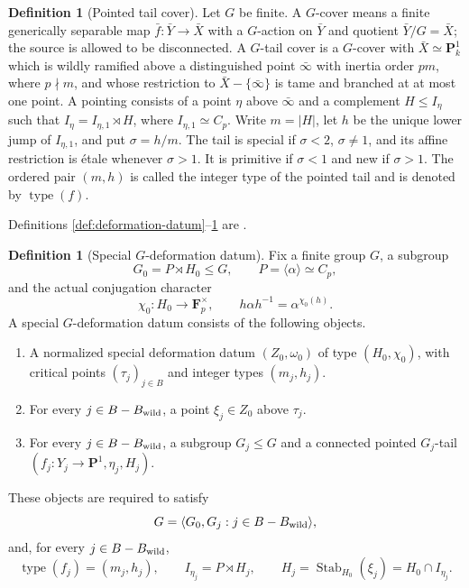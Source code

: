 \documentclass[11pt]{amsart}
\theoremstyle{plain}
\theoremstyle{definition}
\newtheorem{definition}[theorem]{Definition}
\numberwithin{equation}{section}
\begin{document}
\begin{definition}[Pointed tail cover]\label{def:tail}
Let $G$ be finite.  A $G$-cover means a finite generically separable map
$\bar f:\bar Y\to\bar X$ with a $G$-action on $\bar Y$ and quotient
$\bar Y/G=\bar X$; the source is allowed to be disconnected.  A $G$-tail
cover is a $G$-cover with $\bar X\simeq\mathbf P^1_k$ which is wildly
ramified above a distinguished point
$\bar\infty$ with inertia order $pm$, where $p\nmid m$, and whose restriction to
$\bar X-\{\bar\infty\}$ is tame and branched at at most one point.  A
pointing consists of a point $\eta$ above $\bar\infty$ and a complement
$H\leq I_\eta$ such that
$I_\eta=I_{\eta,1}\rtimes H$, where $I_{\eta,1}\simeq C_p$.  Write
$m=|H|$, let $h$ be the unique lower
jump of $I_{\eta,1}$, and put $\sigma=h/m$.  The tail is special if
$\sigma<2$, $\sigma\ne1$, and its affine restriction is \'etale whenever
$\sigma>1$.  It is primitive if $\sigma<1$ and new if $\sigma>1$.
The ordered pair $(m,h)$ is called the integer type of the pointed tail and
is denoted by $\operatorname{type}(f)$.
\end{definition}

Definitions \ref{def:deformation-datum}--\ref{def:tail} are
\cite[Definitions~1.5, 2.7, 2.9, and 2.10]{WewersThree}.

\begin{definition}[Special $G$-deformation datum]
\label{def:special-G-datum}
Fix a finite group $G$, a subgroup
\[
 G_0=P\rtimes H_0\leq G,\qquad P=\langle\alpha\rangle\simeq C_p,
\]
and the actual conjugation character
\[
 \chi_0:H_0\longrightarrow\mathbf F_p^\times,
 \qquad h\alpha h^{-1}=\alpha^{\chi_0(h)}.
\]
A special $G$-deformation datum consists of the following objects.
\begin{enumerate}
\item A normalized special deformation datum $(Z_0,\omega_0)$ of type
$(H_0,\chi_0)$, with critical points $(\tau_j)_{j\in B}$ and integer types
$(m_j,h_j)$.
\item For every $j\in B-B_{\rm wild}$, a point $\xi_j\in Z_0$ above
$\tau_j$.
\item For every $j\in B-B_{\rm wild}$, a subgroup $G_j\leq G$ and a
connected pointed $G_j$-tail
$(f_j:Y_j\to\mathbf P^1,\eta_j,H_j)$.
\end{enumerate}
These objects are required to satisfy
\[
 G=\langle G_0,G_j:j\in B-B_{\rm wild}\rangle,
\]
and, for every $j\in B-B_{\rm wild}$,
\[
 \operatorname{type}(f_j)=(m_j,h_j),\qquad
 I_{\eta_j}=P\rtimes H_j,\qquad
 H_j=\operatorname{Stab}_{H_0}(\xi_j)
     =H_0\cap I_{\eta_j}.
\]
\end{definition}
\end{document}
